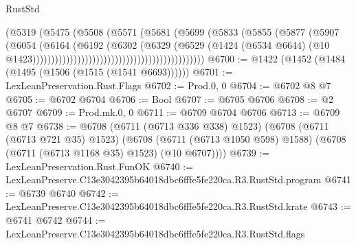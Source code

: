 \begin{lexlean}{RustStd}
\begin{coremodule}
                                                            (@5319
                                                              (@5475
                                                                (@5508
                                                                  (@5571
                                                                    (@5681
                                                                      (@5699
                                                                        (@5833
                                                                          (@5855
                                                                            (@5877
                                                                              (@5907
                                                                                (@6054
                                                                                  (@6164
                                                                                    (@6192
                                                                                      (@6302
                                                                                        (@6329
                                                                                          (@6529
                                                                                            (@1424
                                                                                              (@6534
                                                                                                @6644)
                                                                                              (@10
                                                                                                @1423))))))))))))))))))))))))))))))))))))))))))))))
@6700 := @1422 (@1452 (@1484 (@1495 (@1506 (@1515 (@1541 @6693))))))
@6701 := LexLeanPreservation.Rust.Flags
@6702 := Prod.{0, 0}
@6704 := @6702 @8 @7
@6705 := @6702 @6704
@6706 := Bool
@6707 := @6705 @6706
@6708 := @2 @6707
@6709 := Prod.mk.{0, 0}
@6711 := @6709 @6704 @6706
@6713 := @6709 @8 @7
@6738 := @6708
    (@6711 (@6713 @336 @338) @1523)
    (@6708
      (@6711 (@6713 @721 @35) @1523)
      (@6708 (@6711 (@6713 @1050 @598) @1588) (@6708 (@6711 (@6713 @1168 @35) @1523) (@10 @6707))))
@6739 := LexLeanPreservation.Rust.FunOK
@6740 := LexLeanPreserve.C13e3042395b64018dbc6fffe5fe220ca.R3.RustStd.program
@6741 := @6739 @6740
@6742 := LexLeanPreserve.C13e3042395b64018dbc6fffe5fe220ca.R3.RustStd.krate
@6743 := @6741 @6742
@6744 := LexLeanPreserve.C13e3042395b64018dbc6fffe5fe220ca.R3.RustStd.flags

\end{coremodule}
\end{lexlean}
